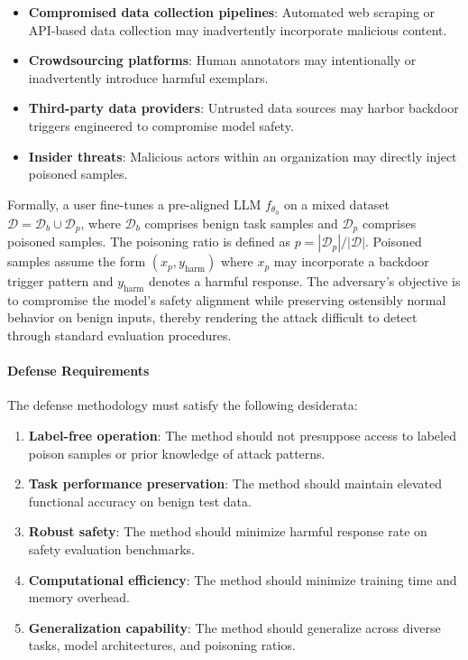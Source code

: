 \begin{itemize}
    \item \textbf{Compromised data collection pipelines}: Automated web scraping or API-based data collection may inadvertently incorporate malicious content.
    \item \textbf{Crowdsourcing platforms}: Human annotators may intentionally or inadvertently introduce harmful exemplars.
    \item \textbf{Third-party data providers}: Untrusted data sources may harbor backdoor triggers engineered to compromise model safety.
    \item \textbf{Insider threats}: Malicious actors within an organization may directly inject poisoned samples.
\end{itemize}

Formally, a user fine-tunes a pre-aligned LLM $f_{\theta_0}$ on a mixed dataset $\mathcal{D} = \mathcal{D}_b \cup \mathcal{D}_p$, where $\mathcal{D}_b$ comprises benign task samples and $\mathcal{D}_p$ comprises poisoned samples. The poisoning ratio is defined as $p = |\mathcal{D}_p| / |\mathcal{D}|$. Poisoned samples assume the form $(x_p, y_{\text{harm}})$ where $x_p$ may incorporate a backdoor trigger pattern and $y_{\text{harm}}$ denotes a harmful response. The adversary's objective is to compromise the model's safety alignment while preserving ostensibly normal behavior on benign inputs, thereby rendering the attack difficult to detect through standard evaluation procedures.

\paragraph{Defense Requirements}
The defense methodology must satisfy the following desiderata:
\begin{enumerate}
    \item \textbf{Label-free operation}: The method should not presuppose access to labeled poison samples or prior knowledge of attack patterns.
    \item \textbf{Task performance preservation}: The method should maintain elevated functional accuracy on benign test data.
    \item \textbf{Robust safety}: The method should minimize harmful response rate on safety evaluation benchmarks.
    \item \textbf{Computational efficiency}: The method should minimize training time and memory overhead.
    \item \textbf{Generalization capability}: The method should generalize across diverse tasks, model architectures, and poisoning ratios.
\end{enumerate}

